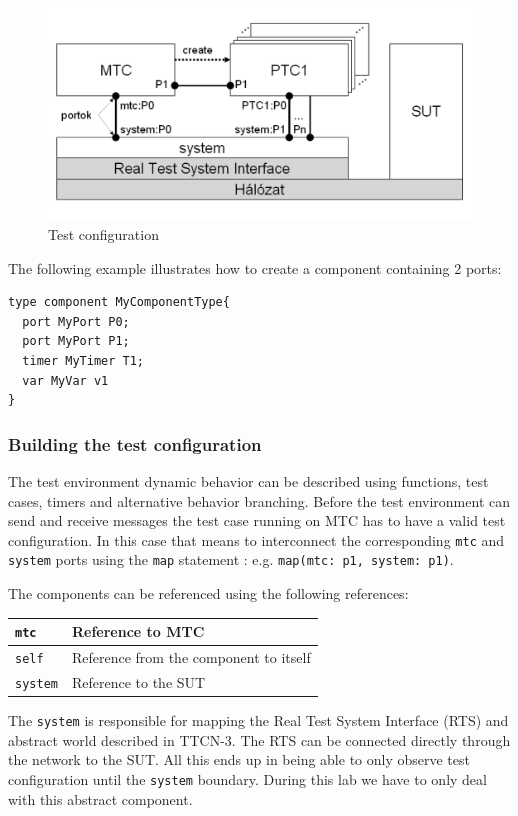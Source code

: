 \documentclass[a4paper]{article}
\begin{document}
\begin{figure}[H]
  \centering
  \includegraphics[width=\textwidth]{figures/TC.png}
  \caption{Test configuration}
  \label{fig:tc}
\end{figure}

The following example illustrates how to create a component containing 2 ports:

{\footnotesize
\begin{lstlisting}
type component MyComponentType{
  port MyPort P0;
  port MyPort P1;
  timer MyTimer T1;
  var MyVar v1
}
\end{lstlisting}
}

\subsubsection{Building the test configuration}

The test environment dynamic behavior can be described using functions, test cases, timers and alternative behavior branching. Before the test environment can send and receive messages the test case running on MTC has to have a valid test configuration. In this case that means to interconnect the corresponding \verb!mtc! and \verb!system! ports using the \verb/map/ statement : e.g. \verb!map(mtc: p1, system: p1)!.

The components can be referenced using the following references:

{\footnotesize
\begin{tabular}{|l|p{11cm}|}
\hline
 \verb/mtc/ &Reference to MTC\\
\hline
 \verb/self/ &Reference from the component to itself\\
\hline
 \verb/system/ &Reference to the SUT\\
\hline
\end{tabular}
}


The \verb/system/ is responsible for mapping the Real Test System Interface (RTS) and abstract world described in TTCN-3.
The RTS can be connected directly through the network to the SUT.
All this ends up in being able to only observe test configuration until the \verb/system/ boundary. During this lab we have to only deal with this abstract component.
\end{document}
